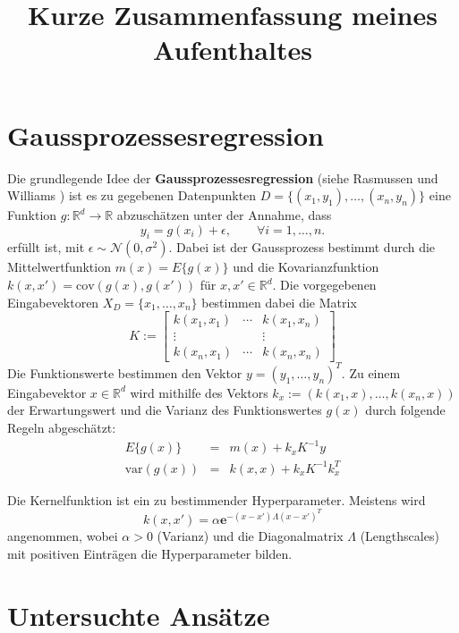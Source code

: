 \documentclass[ngerman]{scrartcl}
\title{Kurze Zusammenfassung meines Aufenthaltes}
\newcommand{\RR}{\mathbb{R}}
\newcommand{\cN}{\mathcal{N}}
\newcommand{\cov}{\mathrm{cov}}
\newcommand{\var}{\mathrm{var}}
\begin{document}
\maketitle
\tableofcontents
\section{Gaussprozessesregression}

Die grundlegende Idee der {\bf Gaussprozessesregression} (siehe Rasmussen und Williams \cite{DBLP:books/lib/RasmussenW06})  ist es zu gegebenen Datenpunkten $D=\{ (x_1,y_1), \ldots, (x_n,y_n)\}$ eine Funktion $g:\RR^d \rightarrow \RR$ abzuschätzen unter der Annahme, dass
\begin{equation}
y_i = g(x_i) + \epsilon, \qquad \forall i=1,\ldots, n.
\end{equation}
erfüllt ist, mit $\epsilon \sim \cN(0,\sigma^2)$.  Dabei ist der Gaussprozess bestimmt durch die Mittelwertfunktion $m(x) = E\{g(x)\}$ und die Kovarianzfunktion $k(x,x') = \cov(g(x),g(x'))$ für $x,x'\in \RR^d$. 
Die vorgegebenen Eingabevektoren $X_D=\{x_1,\ldots, x_n\}$ bestimmen dabei die Matrix
\begin{equation}K := \left[ \begin{array}{ccc} k(x_1,x_1) & \cdots & k(x_1,x_n) \\ \vdots & & \vdots \\ k(x_n,x_1) & \cdots & k(x_n,x_n) \end{array} \right]\end{equation}
Die Funktionswerte bestimmen  den Vektor  $y=(y_1,\ldots, y_n)^T$.
Zu einem Eingabevektor $x\in \RR^d$  wird mithilfe des Vektors $k_x := ( k(x_1, x), \ldots, k(x_n,x) )$ der Erwartungswert und die Varianz des Funktionswertes $g(x)$ durch folgende Regeln abgeschätzt:
\begin{eqnarray}
E\{ g(x)\} &=& m(x) + k_x K^{-1} y\label{pred1}\\
\var(g(x)) &=& k(x,x)  + k_x K^{-1} k_x^T\label{pred2}
\end{eqnarray}

 Die Kernelfunktion ist ein zu bestimmender Hyperparameter.  Meistens wird 
\begin{equation}\label{kernel}
k(x,x') = \alpha \mathbf{e}^{ - (x-x')\Lambda(x-x')^T}
\end{equation}
angenommen, wobei $\alpha>0$ (Varianz) und die Diagonalmatrix $\Lambda$ (Lengthscales)  mit positiven Einträgen die Hyperparameter bilden. 


\section{Untersuchte Ansätze}
\end{document}
